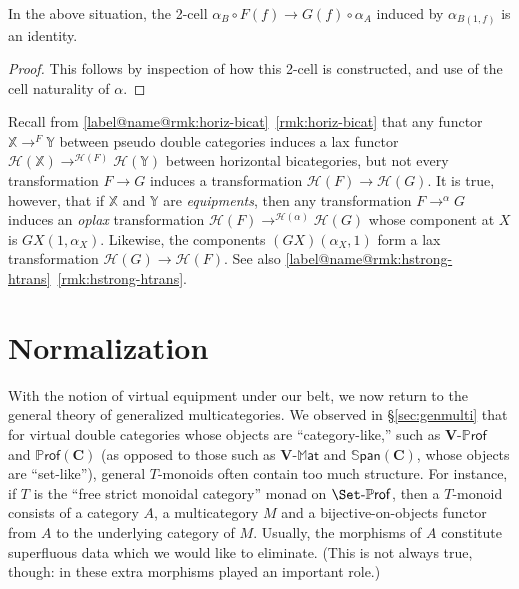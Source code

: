 \documentclass{tac}
\makeatletter
\newcommand{\calH}{\ensuremath{\mathcal{H}}}
\newcommand{\mb}[1]{{\mathbf{#1}}}
\newcommand{\MAT}[1]{\mathbf{#1}\mbox{-}\mathbb{M}\mathsf{at}}
\newcommand{\PROF}[1]{\mathbf{#1}\mbox{-}\mathbb{P}\mathsf{rof}}
\newcommand{\SPAN}[1]{\mathbb{S}\mathsf{pan}\!\left(\mb{#1}\right)}
\newcommand{\iPROF}[1]{\mathbb{P}\mathsf{rof}(\mb{#1})}
\numberwithin{equation}{section}
\def\currthmtype{}
\def\autoref#1{\ref*{label@name@#1}~\ref{#1}}
\def\autoref#1{\ref{label@name@#1}~\ref{#1}}
\let\old@label\label
\def\label#1{%
    {\let\your@currentlabel\@currentlabel%
      \edef\@currentlabel{\currthmtype}%
      \old@label{label@name@#1}}%
    \old@label{#1}}
\makeatother
\begin{document}
\begin{proposition}\label{thm:vert-oplax-is-id}
  In the above situation, the 2-cell $\alpha_B \circ F(f) \to G(f)
  \circ \alpha_A$ induced by $\alpha_{B(1,f)}$ is an identity.
\end{proposition}
\begin{proof}
  This follows by inspection of how this 2-cell is constructed, and
  use of the cell naturality of $\alpha$.
\end{proof}

\begin{remark}\label{rmk:oplax-htrans}
  Recall from \autoref{rmk:horiz-bicat} that any functor
  $\mathbb{X}\to^F \mathbb{Y}$ between pseudo double categories induces
  a lax functor $\calH(\mathbb{X})\to^{\calH(F)} \calH(\mathbb{Y})$
  between horizontal bicategories, but not every transformation $F\to G$
  induces a transformation $\calH(F)\to\calH(G)$.
  It is true, however, that if $\mathbb{X}$ and $\mathbb{Y}$ are
  \emph{equipments}, then any transformation $F\to^\alpha G$
  induces an \emph{oplax} transformation
  $\calH(F)\to^{\calH(\alpha)}\calH(G)$ whose component at $X$ is
  $GX(1,{\alpha_X})$.  Likewise, the components $(GX)({\alpha_X},1)$
  form a lax transformation $\calH(G)\to\calH(F)$.  See also
  \autoref{rmk:hstrong-htrans}.
\end{remark}




\section{Normalization}
\label{sec:normalization}

With the notion of virtual equipment under our belt, we now return to
the general theory of generalized multicategories.
We observed in \S\ref{sec:genmulti} that for virtual double categories
whose objects are ``category-like,'' such as $\PROF{V}$ and $\iPROF{C}$
(as opposed to those such as $\MAT{V}$ and $\SPAN{C}$, whose objects
are ``set-like''), general $T$-monoids often contain too much structure.
For instance, if $T$ is the ``free strict monoidal category'' monad on
$\PROF{\Set}$, then a $T$-monoid consists of a category $A$, a
multicategory $M$ and a bijective-on-objects functor from $A$ to the
underlying category of $M$.  Usually, the morphisms of $A$ constitute
superfluous data which we would like to eliminate.  (This is not
always true, though: in \cite{cheng:opetopic} these extra
morphisms played an important role.)
\end{document}

